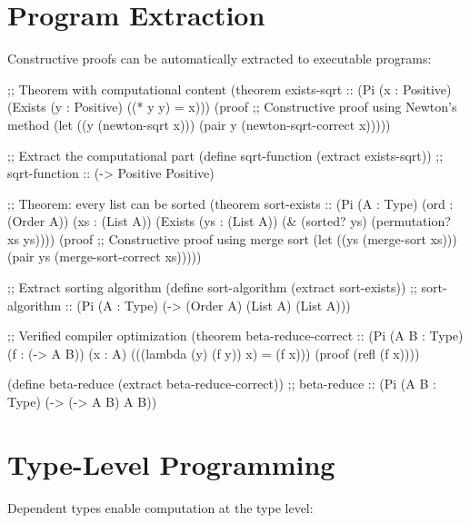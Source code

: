 \section{Program Extraction}
\label{sec:extraction}


Constructive proofs can be automatically extracted to executable programs:

\begin{example}
\begin{lambdustcode}
;; Theorem with computational content
(theorem exists-sqrt :: (Pi (x : Positive) 
                           (Exists (y : Positive) ((* y y) = x)))
  (proof
    ;; Constructive proof using Newton's method
    (let ((y (newton-sqrt x)))
      (pair y (newton-sqrt-correct x)))))

;; Extract the computational part
(define sqrt-function (extract exists-sqrt))
;; sqrt-function :: (-> Positive Positive)

;; Theorem: every list can be sorted  
(theorem sort-exists :: (Pi (A : Type) (ord : (Order A)) (xs : (List A))
                           (Exists (ys : (List A)) 
                             (& (sorted? ys) (permutation? xs ys))))
  (proof
    ;; Constructive proof using merge sort
    (let ((ys (merge-sort xs)))
      (pair ys (merge-sort-correct xs)))))

;; Extract sorting algorithm
(define sort-algorithm (extract sort-exists))
;; sort-algorithm :: (Pi (A : Type) (-> (Order A) (List A) (List A)))

;; Verified compiler optimization
(theorem beta-reduce-correct :: 
  (Pi (A B : Type) (f : (-> A B)) (x : A)
      (((lambda (y) (f y)) x) = (f x)))
  (proof (refl (f x))))

(define beta-reduce (extract beta-reduce-correct))
;; beta-reduce :: (Pi (A B : Type) (-> (-> A B) A B))
\end{lambdustcode}
\end{example}

\section{Type-Level Programming}
\label{sec:type-level-programming}


Dependent types enable computation at the type level:

